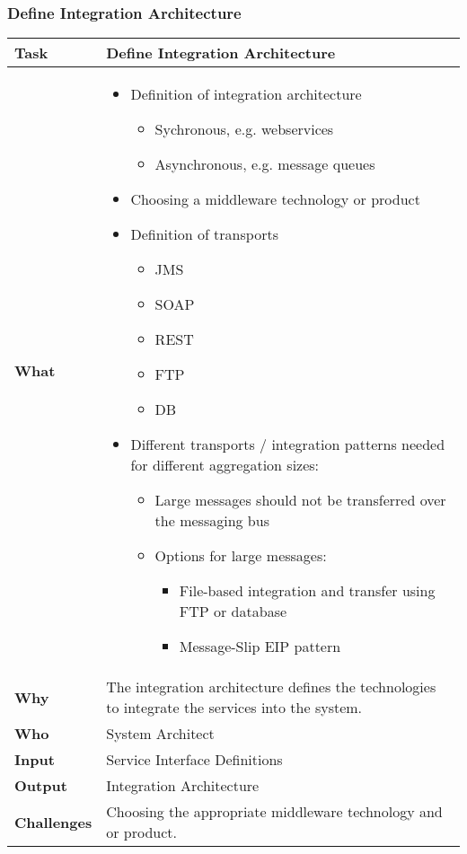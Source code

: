 \subsubsection{Define Integration Architecture}
\begin{tabularx}{\textwidth}{@{} l X @{}}
	\caption{Define Integration Architecture} \label{table:ch6_Task_Define_Integration_Architecture}\\
	\toprule
	\bfseries Task & Define Integration Architecture\\
	\midrule
	\bfseries What &
	\begin{itemize}
		\item Definition of integration architecture
		\begin{itemize}
			\item Sychronous, e.g. webservices
			\item Asynchronous, e.g. message queues
		\end{itemize}
		\item Choosing a middleware technology or product
		\item Definition of transports
		\begin{itemize}
			\item JMS
			\item SOAP
			\item REST
			\item FTP
			\item DB
		\end{itemize}
		\item Different transports / integration patterns needed for different aggregation sizes:
		\begin{itemize}
			\item Large messages should not be transferred over the messaging bus
			\item Options for large messages:
			\begin{itemize}
				\item File-based integration and transfer using FTP or database
				\item Message-Slip EIP pattern
			\end{itemize}
		\end{itemize}
	\end{itemize}
	\\
	\midrule
	\bfseries Why & The integration architecture defines the technologies to integrate the services into the system.\\
	\midrule
	\bfseries Who & System Architect\\
	\midrule 
	\bfseries Input & Service Interface Definitions
	\\
	\midrule 
	\bfseries Output & Integration Architecture\\
	\midrule
	\bfseries Challenges & Choosing the appropriate middleware technology and or product.\\
	\bottomrule
\end{tabularx}

